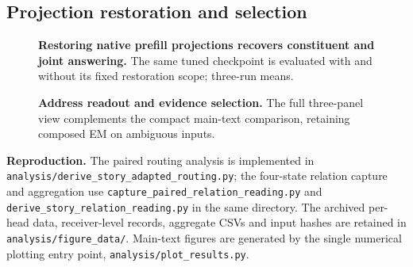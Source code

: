 \FloatBarrier
\subsection{Projection restoration and selection}
\begin{figure}[!htbp]
\centering
\begin{minipage}{.60\textwidth}\centering
  \par
\caption{\textbf{Restoring native prefill projections recovers constituent and joint answering.} The same tuned checkpoint is evaluated with and without its fixed restoration scope; three-run means.}
\label{fig:story_restoration}
\end{minipage}
\end{figure}
\begin{figure}[!htbp]
\centering
\begin{minipage}{.94\textwidth}\centering
  \par
\caption{\textbf{Address readout and evidence selection.} The full three-panel view complements the compact main-text comparison, retaining composed EM on ambiguous inputs.}
\label{fig:repair_closure_full}
\end{minipage}
\end{figure}
\textbf{Reproduction.} The paired routing analysis is implemented in \texttt{analysis/derive\_story\_adapted\_routing.py}; the four-state relation capture and aggregation use \texttt{capture\_paired\_relation\_reading.py} and \texttt{derive\_story\_relation\_reading.py} in the same directory. The archived per-head data, receiver-level records, aggregate CSVs and input hashes are retained in \texttt{analysis/figure\_data/}. Main-text figures are generated by the single numerical plotting entry point, \texttt{analysis/plot\_results.py}.
